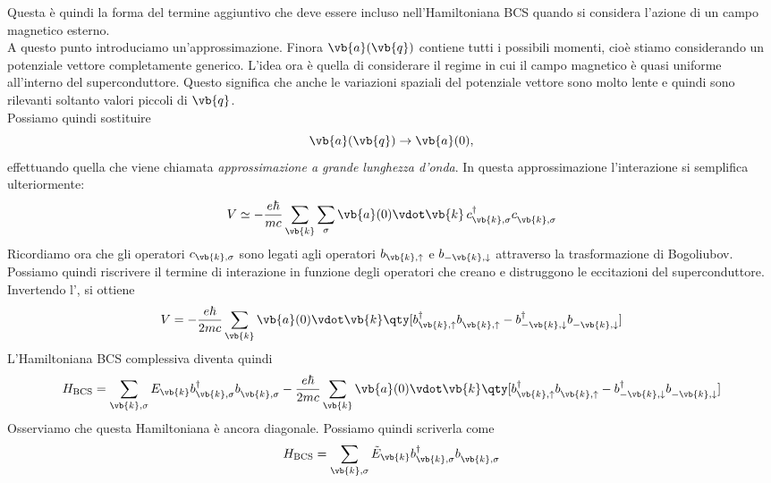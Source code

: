Questa è quindi la forma del termine aggiuntivo che deve essere incluso nell'Hamiltoniana BCS quando si considera l'azione di un campo magnetico esterno.\\
A questo punto introduciamo un'approssimazione. Finora $\vb{a}(\vb{q})$ contiene tutti i possibili momenti, cioè stiamo considerando un potenziale vettore completamente generico. L'idea ora è quella di considerare il regime in cui il campo magnetico è quasi uniforme all'interno del superconduttore. Questo significa che anche le variazioni spaziali del potenziale vettore sono molto lente e quindi sono rilevanti soltanto valori piccoli di $\vb{q}$.\\
Possiamo quindi sostituire
\[
\vb{a}(\vb{q})
\to
\vb{a}(0),
\]
effettuando quella che viene chiamata \emph{approssimazione a grande lunghezza d'onda}. In questa approssimazione l'interazione si semplifica ulteriormente:
\begin{equation*}
   V
   \simeq
   -
   \frac{e \hbar}{mc}
   \sum_{\vb{k}}
   \sum_{\sigma}
   \vb{a}(0)\vdot\vb{k}
   \,
   c^{\dag}_{\vb{k},\sigma}
   c^{\vphantom{\dag}}_{\vb{k},\sigma}
\end{equation*}
Ricordiamo ora che gli operatori $c_{\vb{k},\sigma}$ sono legati agli operatori $b_{\vb{k},\uparrow}$ e $b_{-\vb{k},\downarrow}$ attraverso la trasformazione di Bogoliubov. Possiamo quindi riscrivere il termine di interazione in funzione degli operatori che creano e distruggono le eccitazioni del superconduttore. Invertendo l', si ottiene
\begin{equation*}
   V = - \frac{e \hbar}{2mc} \sum_{\vb{k}} \vb{a}(0)\vdot\vb{k} \qty[ b^{\dag}_{\vb{k},\uparrow} b^{\vphantom{\dag}}_{\vb{k},\uparrow} - b^{\dag}_{-\vb{k},\downarrow} b^{\vphantom{\dag}}_{-\vb{k},\downarrow} ]
\end{equation*}
L'Hamiltoniana BCS complessiva diventa quindi
\begin{equation*}
   H_{\rm BCS} = \sum_{\vb{k},\sigma} E_{\vb{k}} b^{\dag}_{\vb{k},\sigma} b^{\vphantom{\dag}}_{\vb{k},\sigma} - \frac{e \hbar}{2mc} \sum_{\vb{k}} \vb{a}(0)\vdot\vb{k} \qty[ b^{\dag}_{\vb{k},\uparrow} b^{\vphantom{\dag}}_{\vb{k},\uparrow} - b^{\dag}_{-\vb{k},\downarrow} b^{\vphantom{\dag}}_{-\vb{k},\downarrow} ]
\end{equation*}
Osserviamo che questa Hamiltoniana è ancora diagonale. Possiamo quindi scriverla come
\begin{equation*}
   H_{\rm BCS}
   =
   \sum_{\vb{k},\sigma}
   \tilde{E}_{\vb{k}}
   b^{\dag}_{\vb{k},\sigma}
   b^{\vphantom{\dag}}_{\vb{k},\sigma}
\end{equation*}
